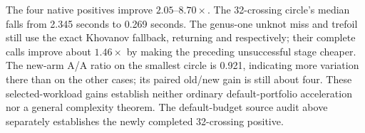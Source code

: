 \begin{center}
\small
\end{center}

The four native positives improve $2.05$--$8.70\times$. The 32-crossing
circle's median falls from 2.345 seconds to 0.269 seconds. The genus-one
unknot miss and trefoil still use the exact Khovanov fallback, returning
 and  respectively; their complete calls
improve about $1.46\times$ by making the preceding unsuccessful stage
cheaper. The new-arm A/A ratio on the smallest circle is 0.921, indicating
more variation there than on the other cases; its paired old/new gain is
still about four. These selected-workload gains establish neither ordinary
default-portfolio acceleration nor a general complexity theorem. The
default-budget source audit above separately establishes the newly
completed 32-crossing positive.
